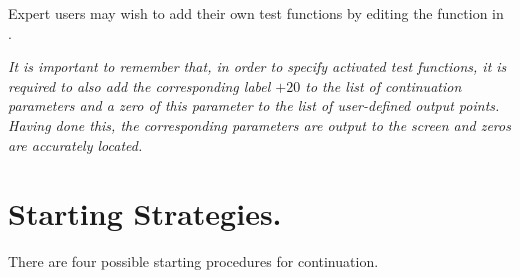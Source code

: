 \documentclass[12pt]{report}
\begin{document}
Expert users may wish to add their own test functions by editing 
the function  in .

{\it It is important to remember that, in order to specify activated 
test functions, it is required to also 
add the corresponding label $+20$ to the list of continuation
parameters and a zero of this parameter to the list of user-defined
output points. Having done this, the corresponding parameters
are output to the screen and zeros are accurately located.} 

\section{ Starting Strategies.} \label{sec:Starting_strategies}
There are four possible starting procedures for continuation. 
\end{document}
